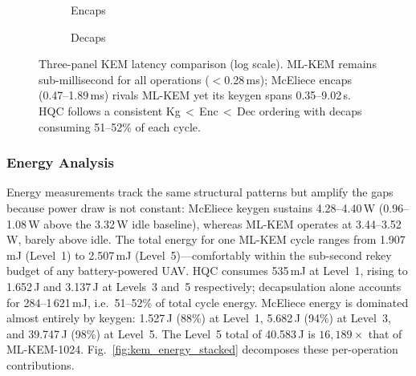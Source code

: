 \begin{figure}[t]
\begin{subfigure}[b]{0.32\textwidth}
\caption{Encaps}\label{fig:kem_tp_enc}
\end{subfigure}
\hfill
\begin{subfigure}[b]{0.32\textwidth}
\centering
{}
\caption{Decaps}\label{fig:kem_tp_dec}
\end{subfigure}
\caption{Three-panel KEM latency comparison (log scale).
  ML-KEM remains sub-millisecond for all operations ($<$0.28\,ms);
  McEliece encaps (0.47--1.89\,ms) rivals ML-KEM yet its keygen
  spans 0.35--9.02\,s.  HQC follows a consistent
  Kg\,$<$\,Enc\,$<$\,Dec ordering with decaps consuming 51--52\%
  of each cycle.}
\label{fig:kem_three_panel}
\end{figure}

\subsubsection{Energy Analysis}

Energy measurements track the same structural patterns but amplify
the gaps because power draw is not constant: McEliece keygen
sustains 4.28--4.40\,W (0.96--1.08\,W above the 3.32\,W idle
baseline), whereas ML-KEM operates at 3.44--3.52\,W, barely
above idle.
The total energy for one ML-KEM cycle ranges from 1.907\,mJ
(Level~1) to 2.507\,mJ (Level~5)---comfortably within the
sub-second rekey budget of any battery-powered UAV.
HQC consumes 535\,mJ at Level~1, rising to 1.652\,J and 3.137\,J
at Levels~3 and~5 respectively; decapsulation alone accounts for
284--1\,621\,mJ, i.e.\ 51--52\% of total cycle energy.
McEliece energy is dominated almost entirely by keygen: 1.527\,J
(88\%) at Level~1, 5.682\,J (94\%) at Level~3, and 39.747\,J
(98\%) at Level~5.  The Level~5 total of 40.583\,J is
$16{,}189\times$ that of ML-KEM-1024.
Fig.~\ref{fig:kem_energy_stacked} decomposes these per-operation
contributions.


